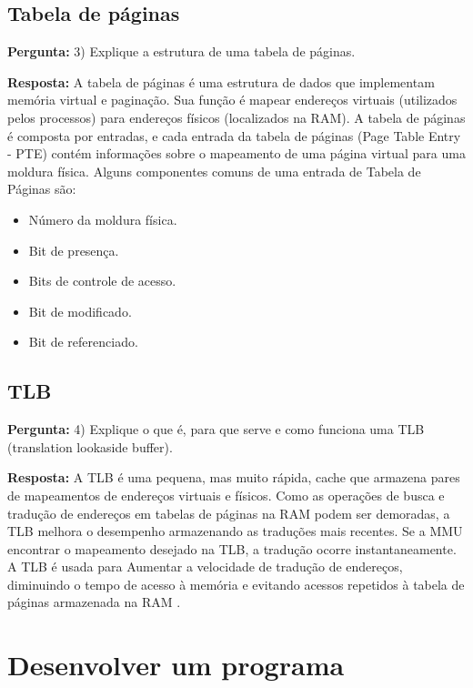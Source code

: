 \documentclass{article}
\begin{document}
\subsection{Tabela de páginas}

\textbf{Pergunta:} 3) Explique a estrutura de uma tabela de páginas. \newline

\textbf{Resposta: }A tabela de páginas é uma estrutura de dados que implementam memória virtual e paginação. Sua função é mapear endereços virtuais (utilizados pelos processos) para endereços físicos (localizados na RAM). A tabela de páginas é composta por entradas, e cada entrada da tabela de páginas (Page Table Entry - PTE) contém informações sobre o mapeamento de uma página virtual para uma moldura física. Alguns componentes comuns de uma entrada de Tabela de Páginas são\cite{tanenbaum2021, profMoraesGerenciamento}:

\begin{itemize}
    \item Número da moldura física.
    \item Bit de presença.
    \item Bits de controle de acesso.
    \item Bit de modificado.
    \item Bit de referenciado.
\end{itemize}

\subsection{TLB}

\textbf{Pergunta:} 4) Explique o que é, para que serve e como funciona uma TLB (translation lookaside buffer). \newline

\textbf{Resposta:} A TLB é uma pequena, mas muito rápida, cache que armazena pares de mapeamentos de endereços virtuais e físicos. Como as operações de busca e tradução de endereços em tabelas de páginas na RAM podem ser demoradas, a TLB melhora o desempenho armazenando as traduções mais recentes. Se a MMU encontrar o mapeamento desejado na TLB, a tradução ocorre instantaneamente. A TLB é usada para Aumentar a velocidade de tradução de endereços, diminuindo o tempo de acesso à memória e  evitando acessos repetidos à tabela de páginas armazenada na RAM \cite{tanenbaum2021, techtargetTLB}.

\section{Desenvolver um programa}
\end{document}
